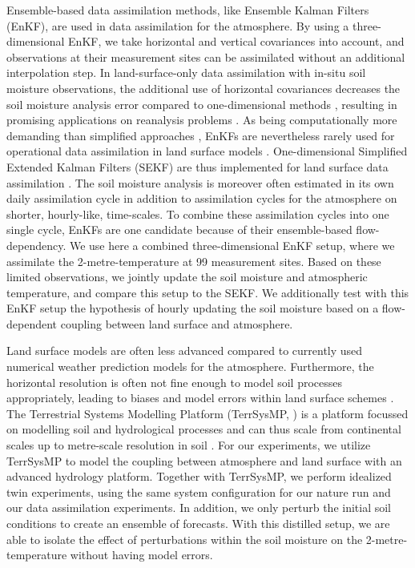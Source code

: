 \documentclass[HESSD, manuscript]{copernicus}
\begin{document}
Ensemble-based data assimilation methods, like Ensemble Kalman Filters (EnKF), are used in data assimilation for the atmosphere.
By using a three-dimensional EnKF, we take horizontal and vertical covariances into account, and observations at their measurement sites can be assimilated without an additional interpolation step.
In land-surface-only data assimilation with in-situ soil moisture observations, the additional use of horizontal covariances decreases the soil moisture analysis error compared to one-dimensional methods \citep{fairbairn_comparing_2015,reichle_extended_2002}, resulting in promising applications on reanalysis problems \citep{draper_assimilation_2019}.
As being computationally more demanding than simplified approaches \citep{reichle_assessing_2003}, EnKFs are nevertheless rarely used for operational data assimilation in land surface models \citep{carrera_canadian_2015,milbrandt_pan-canadian_2016}.
One-dimensional Simplified Extended Kalman Filters (SEKF) are thus implemented for land surface data assimilation \citep{hess_assimilation_2001,rosnay_simplified_2013, mahfouf_comparison_2009,dharssi_operational_2011,belair_operational_2003,giard_implementation_2000}.
The soil moisture analysis is moreover often estimated in its own daily assimilation cycle in addition to assimilation cycles for the atmosphere on shorter, hourly-like, time-scales.
To combine these assimilation cycles into one single cycle, EnKFs are one candidate because of their ensemble-based flow-dependency. 
We use here a combined three-dimensional EnKF setup, where we assimilate the 2-metre-temperature at 99 measurement sites.
Based on these limited observations, we jointly update the soil moisture and atmospheric temperature, and compare this setup to the SEKF.
We additionally test with this EnKF setup the hypothesis of hourly updating the soil moisture based on a flow-dependent coupling between land surface and atmosphere.

Land surface models are often less advanced compared to currently used numerical weather prediction models for the atmosphere.
Furthermore, the horizontal resolution is often not fine enough to model soil processes appropriately, leading to biases and model errors within land surface schemes \citep{dirmeyer_verification_2017, kauffeldt_imbalanced_2015, orth_advancing_2017, best_plumbing_2015}.
The Terrestrial Systems Modelling Platform (TerrSysMP, \citealt{shrestha_scale-consistent_2014, gasper_implementation_2014}) is a platform focussed on modelling soil and hydrological processes and can thus scale from continental scales \citep{kollet_introduction_2018} up to metre-scale resolution in soil \citep{gebler_high_2017}.
For our experiments, we utilize TerrSysMP to model the coupling between atmosphere and land surface with an advanced hydrology platform.
Together with TerrSysMP, we perform idealized twin experiments, using the same system configuration for our nature run and our data assimilation experiments.
In addition, we only perturb the initial soil conditions to create an ensemble of forecasts.
With this distilled setup, we are able to isolate the effect of perturbations within the soil moisture on the 2-metre-temperature without having model errors.
\end{document}
